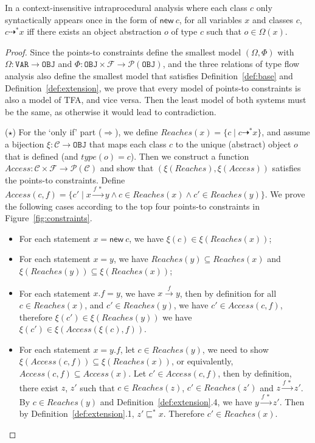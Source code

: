 \documentclass[runningheads]{llncs}
\newcommand{\keyword}[1]{\mathsf{#1}}
\newcommand{\kwnew}[0]{\keyword{new}}
\newcommand\Var{\mathtt{VAR}}
\newcommand\Obj{\mathtt{OBJ}}
\newcommand{\VPT}{\Omega}
\newcommand{\HPT}{\Phi}
\newcommand{\Class}{\mathcal{C}}
\newcommand{\Field}{\mathcal{F}}
\newcommand{\less}{\sqsubseteq}
\newcommand{\tflow}{\dashrightarrow}
\newcommand{\hflow}{\longrightarrow}
\newcommand{\lhflow}[1]{\stackrel{#1}{\hflow}}
\newcommand\set[1]{\{#1\}}
\newcommand\power{\mathcal{P}}
\begin{document}
\begin{lemma}\label{lem:tfa-intra}
In a context-insensitive intraprocedural analysis where each class $c$ only syntactically appears once in the form of $\kwnew\ c$, for all variables $x$ and classes $c$, $c\tflow^*x$ iff there exists an object abstraction $o$ of type $c$ such that $o\in\VPT(x)$.
\end{lemma}
\begin{proof}
Since the points-to constraints define the smallest model $(\VPT, \HPT)$ with $\VPT:\Var\rightarrow\Obj$ and $\HPT:\Obj\times\Field\rightarrow\power(\Obj)$, and the three relations of type flow analysis also define the smallest model that satisfies Definition~\ref{def:base} and Definition~\ref{def:extension}, we prove that every model of points-to constraints is also a model of TFA, and vice versa. Then the least model of both systems must be the same, as otherwise it would lead to contradiction.

\medskip

($\star$) For the `only if' part ($\Rightarrow$), we define $Reaches(x)=\set{c\mid c\tflow^* x}$, and assume a bijection $\xi:\Class\rightarrow\Obj$ that maps each class $c$ to the unique (abstract) object $o$ that is defined (and $type(o)=c$). Then we construct a function $Access:\Class\times\Field\rightarrow\power(\Class)$ and show that $(\xi(Reaches),\xi(Access))$ satisfies the points-to constraints. Define $Access(c,f)=\set{c'\mid x\lhflow{f\ *}y\wedge c\in Reaches(x)\wedge c'\in Reaches(y)}$. We prove the following cases according to the top four points-to constraints in Figure~\ref{fig:constraints}.
\begin{itemize}
\item For each statement $x = \kwnew\ c$, we have $\xi(c)\in\xi(Reaches(x))$;
\item For each statement $x = y$, we have $Reaches(y)\subseteq Reaches(x)$ and $\xi(Reaches(y))\subseteq\xi(Reaches(x))$;
\item For each statement $x.f = y$, we have $x\lhflow{f}y$, then by definition for all $c\in Reaches(x)$, and $c'\in Reaches(y)$, we have $c'\in Access(c,f)$, therefore $\xi(c')\in\xi(Reaches(y))$ we have $\xi(c')\in \xi(Access(\xi(c),f))$.
\item For each statement $x = y.f$, let $c\in Reaches(y)$, we need to show $\xi(Access(c,f))\subseteq\xi(Reaches(x))$, or equivalently, $Access(c,f)\subseteq Access(x)$. Let $c'\in Access(c,f)$, then by definition, there exist $z$, $z'$ such that $c\in Reaches(z)$, $c'\in Reaches(z')$ and $z\lhflow{f\ *}z'$. By $c\in Reaches(y)$ and Definition~\ref{def:extension}.4, we have $y\lhflow{f\ *}z'$. Then by Definition~\ref{def:extension}.1, $z'\less^*x$. Therefore $c'\in Reaches(x)$.
\end{itemize}


\end{proof}
\end{document}
